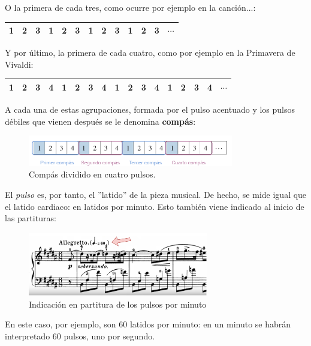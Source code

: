 \documentclass[a4paper, openright, 11pt, titlepage]{report}
\theoremstyle{definition}\newtheorem{defin}[propo]{Definition}
\theoremstyle{definition}\newtheorem{obser}[propo]{Remark}
\theoremstyle{definition}\newtheorem{ejem}[propo]{Ejemplo}
\theoremstyle{definition}\newtheorem{algoritmo}[propo]{Algoritmo}
\begin{document}
O la primera de cada tres, como ocurre por ejemplo en la canción...:
\begin{table}[H]
    \centering
    \begin{tabular}{|c|c|c|c|c|c|c|c|c|c|c|c|c|}
    \hline
        \cellcolor{acento}1 & 2 & 3 & \cellcolor{acento}1 & 2 & 3 & \cellcolor{acento}1 & 2 & 3 & \cellcolor{acento}1 & 2 & 3 & $\cdots$ \\
    \hline
    \end{tabular}
\end{table}
Y por último, la primera de cada cuatro, como por ejemplo en la Primavera de Vivaldi:
\begin{table}[H]
    \centering
    \begin{tabular}{|c|c|c|c|c|c|c|c|c|c|c|c|c|c|c|c|c|}
    \hline
        \cellcolor{acento}1 & 2 & 3 & 4 & \cellcolor{acento}1 & 2 & 3 & 4 & \cellcolor{acento}1 & 2 & 3 & 4 & \cellcolor{acento}1 & 2 & 3 & 4 & $\cdots$ \\
    \hline
    \end{tabular}
\end{table}
A cada una de estas agrupaciones, formada por el pulso acentuado y los pulsos débiles que vienen después se le denomina \textbf{compás}:
\begin{figure}[H]
    \centering
    \includegraphics[width = 0.8\textwidth]{compases.png}
    \caption{Compás dividido en cuatro pulsos.}
\end{figure}
El \textit{pulso} es, por tanto, el ''latido'' de la pieza musical. De hecho, se mide igual que el latido cardiaco: en latidos por minuto. Esto también viene indicado al inicio de las partituras:
\begin{figure}[H]
    \centering
    \includegraphics[width = 0.7\textwidth]{tempo.png}
    \caption{Indicación en partitura de los pulsos por minuto}
\end{figure}
En este caso, por ejemplo, son 60 latidos por minuto: en un minuto se habrán interpretado 60 pulsos, uno por segundo.\\\\
\end{document}
